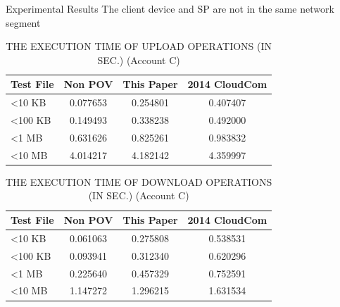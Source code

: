 \documentclass{beamer}
\begin{document}
\begin{CJK}{UTF8}{bkai}
\begin{frame}{Experimental Results}
{The client device and SP are \alert{not} in the same network segment}
	\begin{table}[]
    \large    
    \centering
    \caption{THE EXECUTION TIME OF \alert{UPLOAD} OPERATIONS (IN SEC.) (Account C)}
    \begin{tabular}{lccc}
        Test File        & Non POV  & This Paper & 2014 CloudCom \\ \hline
        \textless 10 KB  & 0.077653 & 0.254801   & 0.407407      \\ \hline
        \textless 100 KB & 0.149493 & 0.338238   & 0.492000      \\ \hline
        \textless 1 MB   & 0.631626 & 0.825261   & 0.983832      \\ \hline
        \textless 10 MB  & 4.014217 & 4.182142   & 4.359997      \\ \hline
    \end{tabular}
    \end{table}
    \begin{table}[]
    \large 
    \centering
    \caption{THE EXECUTION TIME OF \alert{DOWNLOAD} OPERATIONS (IN SEC.) (Account C)}
    \begin{tabular}{lccc}
    Test File        & Non POV  & This Paper & 2014 CloudCom \\ \hline
    \textless 10 KB  & 0.061063 & 0.275808   & 0.538531      \\ \hline
    \textless 100 KB & 0.093941 & 0.312340   & 0.620296      \\ \hline
    \textless 1 MB   & 0.225640 & 0.457329   & 0.752591      \\ \hline
    \textless 10 MB  & 1.147272 & 1.296215   & 1.631534      \\ \hline
    \end{tabular}
    \end{table}
\end{frame}


\end{CJK}
\end{document}
